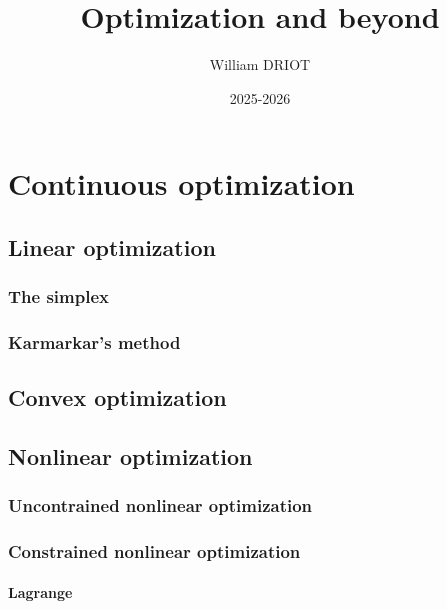 \documentclass[12pt,openany,oneside]{book}
\title{\textbf{Optimization and beyond}}
\author{William DRIOT}
\date{2025-2026}
\theoremstyle{definition}
\numberwithin{definition}{section}
\numberwithin{theorem}{section}
\numberwithin{corollary}{section}
\numberwithin{proposition}{section}
\numberwithin{notation}{section}
\numberwithin{remark}{section}
\numberwithin{hypothesis}{section}
\numberwithin{example}{section}
\begin{document}
\maketitle

\tableofcontents

\setlength{\parindent}{15pt}
\setlength{\parskip}{6pt}

\newpage


% 
% 
% 
% 

\part{Continuous optimization}

\chapter{Linear optimization}

\section{The simplex}


\section{Karmarkar's method}

\chapter{Convex optimization}

\chapter{Nonlinear optimization}

\section{Uncontrained nonlinear optimization}
\section{Constrained nonlinear optimization}
\subsection{Lagrange}
\end{document}
